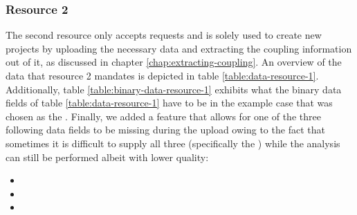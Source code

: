\documentclass[12pt,a4paper]{report}
\begin{document}
\subsubsection{Resource 2}
The second resource only accepts 
requests and is solely used to create new projects by uploading the necessary
data and extracting the coupling information out of it, as discussed in chapter
\ref{chap:extracting-coupling}. An overview of the data that resource 2
mandates is depicted in table \ref{table:data-resource-1}. Additionally, table
\ref{table:binary-data-resource-1} exhibits what the binary data fields of
table \ref{table:data-resource-1} have to be in the example case that 
was chosen as the . Finally, we added a feature
that allows for one of the three following data fields to be missing during the
upload owing to the fact that sometimes it is difficult to supply all three
(specifically the ) while the analysis can still be
performed albeit with lower quality:
\begin{itemize}[noitemsep]
  \item {}
  \item {}
  \item {}
\end{itemize}
\end{document}
